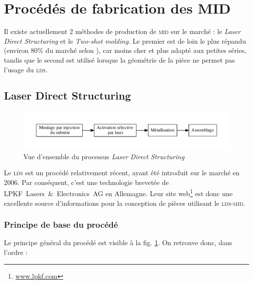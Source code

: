 \section{Procédés de fabrication des MID}
Il existe actuellement 2 méthodes de production de \textsc{mid} sur le marché :
le \emph{Laser Direct Structuring} et le \emph{Two-shot molding}. Le premier est
de loin le plus répandu (environ 80\% du marché selon \cite{mid-2011}), car moins
cher et plus adapté aux petites séries, tandis que le second est utilisé lorsque
la géométrie de la pièce ne permet pas l'usage du \textsc{lds}.

\subsection{Laser Direct Structuring}
\begin{figure}[h]
    \begin{center}
        \includegraphics[width=\textwidth]{images/lds_process}
        \caption{Vue d'ensemble du processus \emph{Laser Direct Structuring}}\label{fig:lds-process}
    \end{center}
\end{figure}
Le \textsc{lds} est un procédé relativement récent, ayant été introduit sur le
marché en 2006. Par conséquent, c'est une technologie brevetée de LPKF~Lasers~\&~Electronics~AG
en Allemagne. Leur site web\footnote{\url{www.lpkf.com}} est donc
une excellente source d'informations pour la conception de pièces utilisant
le \textsc{lds-mid}.

\subsubsection{Principe de base du procédé}
Le principe général du procédé est visible à la fig. \ref{fig:lds-process}. On
retrouve donc, dans l'ordre :


